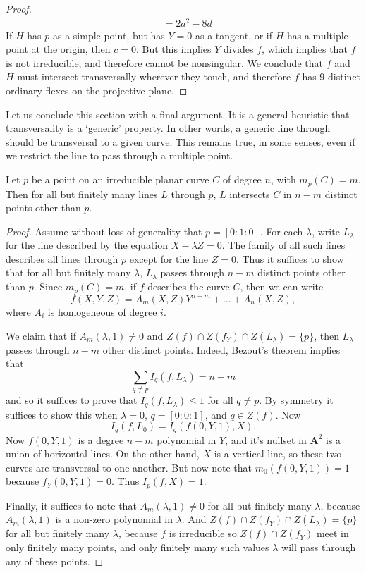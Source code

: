 \begin{proof}
\begin{align*}
        &= 2a^2 - 8d
    \end{align*}
    If $H$ has $p$ as a simple point, but has $Y = 0$ as a tangent, or if $H$ has a multiple point at the origin, then $c = 0$. But this implies $Y$ divides $f$, which implies that $f$ is not irreducible, and therefore cannot be nonsingular. We conclude that $f$ and $H$ must intersect transversally wherever they touch, and therefore $f$ has 9 distinct ordinary flexes on the projective plane.
\end{proof}

Let us conclude this section with a final argument. It is a general heuristic that transversality is a `generic' property. In other words, a generic line through should be transversal to a given curve. This remains true, in some senses, even if we restrict the line to pass through a multiple point.

\begin{theorem}
    Let $p$ be a point on an irreducible planar curve $C$ of degree $n$, with $m_p(C) = m$. Then for all but finitely many lines $L$ through $p$, $L$ intersects $C$ in $n-m$ distinct points other than $p$.
\end{theorem}
\begin{proof}
    Assume without loss of generality that $p = [0:1:0]$. For each $\lambda$, write $L_\lambda$ for the line described by the equation $X - \lambda Z = 0$. The family of all such lines describes all lines through $p$ except for the line $Z = 0$. Thus it suffices to show that for all but finitely many $\lambda$, $L_\lambda$ passes through $n-m$ distinct points other than $p$. Since $m_p(C) = m$, if $f$ describes the curve $C$, then we can write
    \[ f(X,Y,Z) = A_m(X,Z) Y^{n-m} + \dots + A_n(X,Z), \]
    where $A_i$ is homogeneous of degree $i$.

    We claim that if $A_m(\lambda,1) \neq 0$ and $Z(f) \cap Z(f_Y) \cap Z(L_\lambda) = \{ p \}$, then $L_\lambda$ passes through $n-m$ other distinct points. Indeed, Bezout's theorem implies that
    \[ \sum_{q \neq p} I_q(f,L_\lambda) = n - m \]
    and so it suffices to prove that $I_q(f,L_\lambda) \leq 1$ for all $q \neq p$. By symmetry it suffices to show this when $\lambda = 0$, $q = [0:0:1]$, and $q \in Z(f)$. Now
    \[ I_q(f,L_0) = I_q(f(0,Y,1), X). \]
    Now $f(0,Y,1)$ is a degree $n-m$ polynomial in $Y$, and it's nullset in $\mathbf{A}^2$ is a union of horizontal lines. On the other hand, $X$ is a vertical line, so these two curves are transversal to one another. But now note that $m_0(f(0,Y,1)) = 1$ because $f_Y(0,Y,1) = 0$. Thus $I_p(f,X) = 1$.

    Finally, it suffices to note that $A_m(\lambda,1) \neq 0$ for all but finitely many $\lambda$, because $A_m(\lambda,1)$ is a non-zero polynomial in $\lambda$. And $Z(f) \cap Z(f_Y) \cap Z(L_\lambda) = \{ p \}$ for all but finitely many $\lambda$, because $f$ is irreducible so $Z(f) \cap Z(f_Y)$ meet in only finitely many points, and only finitely many such values $\lambda$ will pass through any of these points.
\end{proof}

